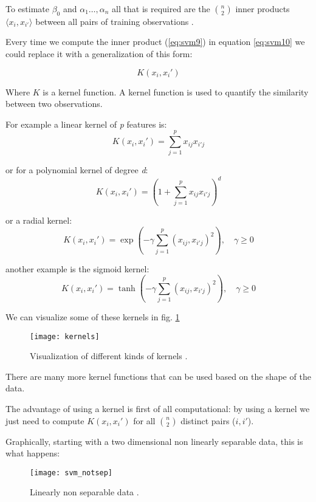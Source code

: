 To estimate $\beta_{0}$ and $\alpha_1 \dots, \alpha_n$ all that is required are the $n \choose 2$ inner products $\langle x_i, x_{i'} \rangle$ between all pairs of training observations \cite{ISLR}.

Every time we compute the inner product (\ref{eq:svm9}) in equation \ref{eq:svm10} we could replace it with a generalization of this form:

\begin{equation} \label{eq:svm11}
K(x_i, x_i')
\end{equation}

Where $K$ is a kernel function. A kernel function is used to quantify the similarity between two observations. 

For example a linear kernel of \textit{p} features is:
\begin{equation} \label{eq:svm12}
	K(x_i, x_i') = \sum_{j=1}^{p} x_{ij}x_{i'j}
\end{equation}

or for a polynomial kernel of degree \textit{d}:
\begin{equation} \label{eq:svm13}
	K(x_i, x_i') = (1 + \sum_{j=1}^{p} x_{ij}x_{i'j})^d
\end{equation}

or a radial kernel:
\begin{equation} \label{eq:svm14}
	K(x_i, x_i') = \exp(-\gamma\sum_{j=1}^{p} (x_{ij}, x_{i'j})^2), \quad \gamma \ge 0
\end{equation} 

another example is the sigmoid kernel:
\begin{equation} \label{eq:svm15}
	K(x_i, x_i') = \tanh(-\gamma\sum_{j=1}^{p} (x_{ij}, x_{i'j})^2), \quad \gamma \ge 0
\end{equation}

We can visualize some of these kernels in fig. \ref{fig:kernels}
\begin{figure}[H]
	\centering
	\texttt{[image: kernels]}
	\caption{Visualization of different kinds of kernels \cite{kernels}.}
	\label{fig:kernels}
\end{figure} 

There are many more kernel functions that can be used based on the shape of the data.

The advantage of using a kernel is first of all computational: by using a kernel we just need to compute $K(x_i, x_i')$ for all $n \choose 2$ distinct pairs ($i, i'$).

Graphically, starting with a two dimensional non linearly separable data, this is what happens:
\begin{figure}[H]
	\centering
	\texttt{[image: svm\_notsep]}
	\caption{Linearly non separable data \cite{kernel_trick}.}
\end{figure} 

